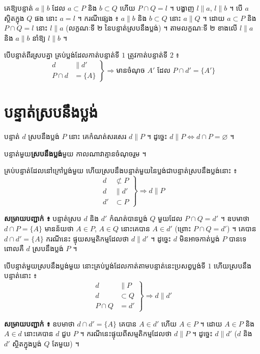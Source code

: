 \begin{pro}
គេឱ្យបន្ទាត់ $a \parallel b$ ដែល $a \subset P$ និង $b \subset Q$ ហើយ $P \cap Q = l$ ។ បង្ហាញ $l \parallel a$, $l \parallel b$ ។
\ans
បើ $a$ ស្ថិតក្នុង $Q$ ផង នោះ $a = l$ ។ ករណីផ្សេង ៖ $a \parallel b$ និង $b \subset Q$ នោះ $a \parallel Q$ ។ ដោយ $a \subset P$ និង $P \cap Q = l$ នោះ $l \parallel a$ (លក្ខណៈទី ២ នៃបន្ទាត់ស្របនឹងប្លង់) ។ តាមលក្ខណៈទី ២ ខាងលើ $l \parallel a$ និង $a \parallel b$ នាំឱ្យ $l \parallel b$ ។
\end{pro}

\begin{theorem}[លក្ខណៈទី ៣]
បើបន្ទាត់ពីរស្របគ្នា គ្រប់ប្លង់ដែលកាត់បន្ទាត់ទី $1$ ត្រូវកាត់បន្ទាត់ទី $2$ ៖
\[
\left.\begin{aligned} d &\parallel d'\\ P \cap d &= \{A\} \end{aligned}\right\} \Rightarrow \text{មានចំណុច } A' \text{ ដែល } P \cap d' = \{A'\}
\]
\end{theorem}

\section{បន្ទាត់ស្របនឹងប្លង់}
បន្ទាត់ $d$ ស្របនឹងប្លង់ $P$ នោះ គេកំណត់សរសេរ $d \parallel P$ ។ ដូច្នេះ $d \parallel P \Leftrightarrow d \cap P = \varnothing$ ។
\begin{definition}[និយមន័យ]
បន្ទាត់មួយ\textbf{ស្របនឹងប្លង់}មួយ កាលណាវាគ្មានចំណុចរួម ។
\end{definition}

\begin{theorem}[លក្ខណៈទី ១]
គ្រប់បន្ទាត់ដែលនៅក្រៅប្លង់មួយ ហើយស្របនឹងបន្ទាត់មួយនៃប្លង់ជាបន្ទាត់ស្របនឹងប្លង់នោះ ៖
\[
\left.\begin{aligned} d &\not\subset P\\ d &\parallel d'\\ d' &\subset P \end{aligned}\right\} \Rightarrow d \parallel P
\]
\end{theorem}
\textbf{សម្រាយបញ្ជាក់ ៖} បន្ទាត់ស្រប $d$ និង $d'$ កំណត់បានប្លង់ $Q$ មួយដែល $P \cap Q = d'$ ។ ឧបមាថា $d \cap P = \{A\}$ មានន័យថា $A \in P$, $A \in Q$ នោះគេបាន $A \in d'$ (ព្រោះ $P \cap Q = d'$) ។ គេបាន $d \cap d' = \{A\}$ ករណីនេះ ផ្ទុយសម្មតិកម្មដែលថា $d \parallel d'$ ។ ដូច្នេះ $d$ មិនអាចកាត់ប្លង់ $P$ បានទេ ពោលគឺ $d$ ស្របនឹងប្លង់ $P$ ។

\begin{theorem}[លក្ខណៈទី ២]
បើបន្ទាត់មួយស្របនឹងប្លង់មួយ នោះគ្រប់ប្លង់ដែលកាត់តាមបន្ទាត់នេះប្រសព្វប្លង់ទី $1$ ហើយស្របនឹងបន្ទាត់នោះ ៖
\[
\left.\begin{aligned} d &\parallel P\\ d &\subset Q\\ P \cap Q &= d' \end{aligned}\right\} \Rightarrow d \parallel d'
\]
\end{theorem}
\textbf{សម្រាយបញ្ជាក់ ៖} ឧបមាថា $d \cap d' = \{A\}$ គេបាន $A \in d'$ ហើយ $A \in P$ ។ ដោយ $A \in P$ និង $A \in d$ នោះគេបាន $d$ ជួប $P$ ។ ករណីនេះផ្ទុយពីសម្មតិកម្មដែលថា $d \parallel P$ ។ ដូច្នេះ $d \parallel d'$ ($d$ និង $d'$ ស្ថិតក្នុងប្លង់ $Q$ តែមួយ) ។

